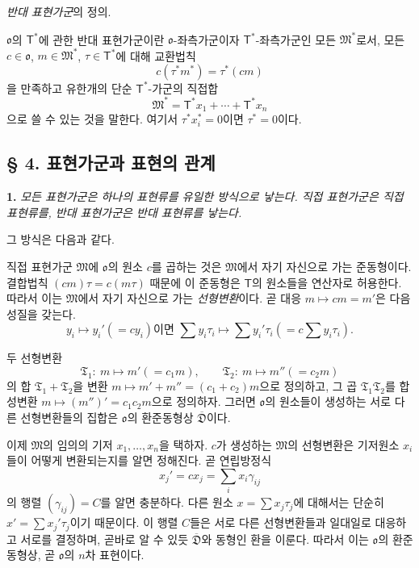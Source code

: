 \emph{반대 표현가군}의 정의.

\(\mathfrak{o}\)의 \(\mathsf T^*\)에 관한 반대 표현가군이란 \(\mathfrak{o}\)-좌측가군이자 \(\mathsf T^*\)-좌측가군인 모든 \(\mathfrak M^*\)로서, 모든 \(c\in\mathfrak{o}\), \(m\in\mathfrak M^*\), \(\tau\in\mathsf T^*\)에 대해 교환법칙
\[
        c(\tau^*m^*)=\tau^*(cm)
\]
을 만족하고 유한개의 단순 \(\mathsf T^*\)-가군의 직접합
\[
        \mathfrak M^*
        =\mathsf T^*x_1+\cdots+\mathsf T^*x_n
\]
으로 쓸 수 있는 것을 말한다. 여기서 \(\tau^*x_i^*=0\)이면 \(\tau^*=0\)이다.

\subsection*{§ 4. 표현가군과 표현의 관계}

\textbf{1.} \emph{모든 표현가군은 하나의 표현류를 유일한 방식으로 낳는다. 직접 표현가군은 직접 표현류를, 반대 표현가군은 반대 표현류를 낳는다.}

그 방식은 다음과 같다.

직접 표현가군 \(\mathfrak M\)에 \(\mathfrak{o}\)의 원소 \(c\)를 곱하는 것은 \(\mathfrak M\)에서 자기 자신으로 가는 준동형이다. 결합법칙 \((cm)\tau=c(m\tau)\) 때문에 이 준동형은 \(\mathsf T\)의 원소들을 연산자로 허용한다. 따라서 이는 \(\mathfrak M\)에서 자기 자신으로 가는 \emph{선형변환}이다. 곧 대응 \(m\mapsto cm=m'\)은 다음 성질을 갖는다.
\[
\text{\(y_i\mapsto y_i'(=cy_i)\)이면 }
\sum y_i\tau_i\mapsto
\sum y_i'\tau_i\left(=c\sum y_i\tau_i\right).
\]

두 선형변환
\[
\mathfrak T_1:\ m\mapsto m'(=c_1m),
\qquad
\mathfrak T_2:\ m\mapsto m''(=c_2m)
\]
의 합 \(\mathfrak T_1+\mathfrak T_2\)을 변환 \(m\mapsto m'+m''=(c_1+c_2)m\)으로 정의하고, 그 곱 \(\mathfrak T_1\mathfrak T_2\)를 합성변환 \(m\mapsto(m'')'=c_1c_2m\)으로 정의하자. 그러면 \(\mathfrak{o}\)의 원소들이 생성하는 서로 다른 선형변환들의 집합은 \(\mathfrak{o}\)의 환준동형상 \(\overline{\mathfrak D}\)이다.

이제 \(\mathfrak M\)의 임의의 기저 \(x_1,\ldots,x_n\)을 택하자. \(c\)가 생성하는 \(\mathfrak M\)의 선형변환은 기저원소 \(x_i\)들이 어떻게 변환되는지를 알면 정해진다. 곧 연립방정식
\[
        x_j'=cx_j=\sum_i x_i\gamma_{ij}
\]
의 행렬 \((\gamma_{ij})=C\)를 알면 충분하다. 다른 원소 \(x=\sum x_j\tau_j\)에 대해서는 단순히 \(x'=\sum x_j'\tau_j\)이기 때문이다. 이 행렬 \(C\)들은 서로 다른 선형변환들과 일대일로 대응하고 서로를 결정하며, 곧바로 알 수 있듯 \(\overline{\mathfrak D}\)와 동형인 환을 이룬다. 따라서 이는 \(\mathfrak{o}\)의 환준동형상, 곧 \(\mathfrak{o}\)의 \(n\)차 표현이다.


